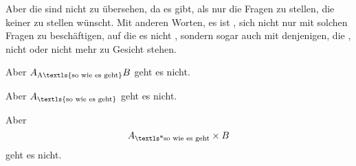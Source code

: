 \documentclass[10pt]{article}
\begin{document}
  Aber die  sind nicht zu übersehen, da es
 gibt, als nur die Fragen zu stellen, die keiner zu stellen
wünscht. Mit anderen Worten, es ist , sich nicht nur mit
solchen Fragen zu beschäftigen, auf die es nicht , sondern sogar auch mit
denjenigen, die , nicht oder nicht mehr zu Gesicht stehen.

Aber $A_{\text{A\textls{so wie es geht}\null}}B$ geht es nicht.

Aber $A_{\textrm{\textls{so wie es geht}}}$ geht es nicht.

Aber \[A_{\textrm{\textls*{so wie es geht}}} \times B\] geht es nicht.
\end{document}
